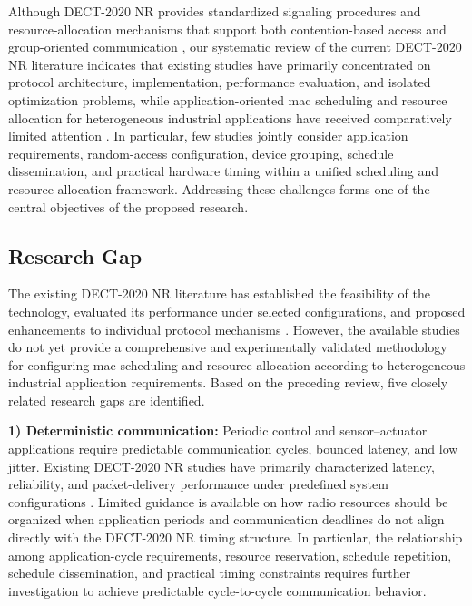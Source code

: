 \documentclass[12pt,a4paper]{article}
\begin{document}
Although DECT-2020 NR provides standardized signaling procedures and
resource-allocation mechanisms that support both contention-based access and
group-oriented communication \cite{etsi_ts103636_4}, our systematic review of
the current DECT-2020 NR literature indicates that existing studies have
primarily concentrated on protocol architecture, implementation, performance
evaluation, and isolated optimization problems, while application-oriented
\gls{mac} scheduling and resource allocation for heterogeneous industrial
applications have received comparatively limited attention
\cite{gaidamakaOptimizingDelaysRandom2025,kovalchukovDECT2020NewRadio2022}.
In particular, few studies jointly consider application requirements,
random-access configuration, device grouping, schedule dissemination, and
practical hardware timing within a unified scheduling and resource-allocation
framework. Addressing these challenges forms one of the central objectives of
the proposed research.


\subsection{Research Gap}
\label{subsec:research_gap}

The existing DECT-2020 NR literature has established the feasibility of the technology, evaluated its performance under selected configurations, and proposed enhancements to individual protocol mechanisms
\cite{dhanwaniAssessmentCandidateTechnology2020,
anttonenEnablingMassiveMachine2021a,
pennerURLLCPerformanceEvaluation2021,
wassmannPerformanceDECT2020NR2024,
ahmadMACProtocolReducing2024,
nihtilaEnergyConsumptionDECT20202022}.
However, the available studies do not yet provide a comprehensive and experimentally validated methodology for configuring \gls{mac} scheduling and resource allocation according to heterogeneous industrial application requirements. Based on the preceding review, five closely related research gaps are identified.

\textbf{1) Deterministic communication:}
Periodic control and sensor--actuator applications require predictable communication cycles, bounded latency, and low jitter. Existing DECT-2020 NR studies have primarily characterized latency, reliability, and packet-delivery performance under predefined system configurations
\cite{pennerURLLCPerformanceEvaluation2021,
smidaETSIDECT2020Component2023,
llagunoPhysicalLayerPerformance2024,
bandaraExperimentalValidationAnalysis2025}.
Limited guidance is available on how radio resources should be organized when application periods and communication deadlines do not align directly with the DECT-2020 NR timing structure. In particular, the relationship among application-cycle requirements, resource reservation, schedule repetition, schedule dissemination, and practical timing constraints requires further investigation to achieve predictable cycle-to-cycle communication behavior.
\end{document}
